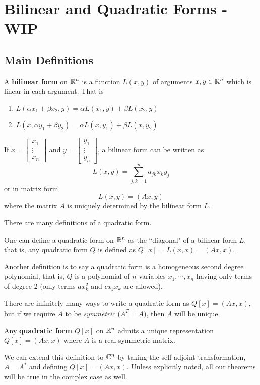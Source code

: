 \chapter{Bilinear and Quadratic Forms - WIP}

\section{Main Definitions}

\begin{definition}
A \textbf{bilinear form} on $\mathbb{R}^{n}$ is a function $L(x, y)$ of arguments $x, y \in \mathbb{R}^{n}$ which is linear in each argument. That is 
\begin{enumerate}
	\item $L(\alpha x_{1} + \beta x_{2}, y) = \alpha L(x_{1}, y) + \beta L(x_{2}, y)$
	\item $L(x, \alpha y_{1} + \beta y_{2}) = \alpha L(x, y_{1}) + \beta L(x, y_{2})$
\end{enumerate}

If $x = \begin{bmatrix}
x_{1} \\
\vdots \\
x_{n}
\end{bmatrix}$ and $y = \begin{bmatrix}
y_{1} \\
\vdots \\
y_{n}
\end{bmatrix}$, a bilinear form can be written as 
$$L(x, y) = \sum_{j, k = 1}^{n} a_{jk} x_{k} y_{j}$$
or in matrix form 
$$L(x, y) = (Ax, y)$$
where the matrix $A$ is uniquely determined by the bilinear form $L$.
\end{definition}

\begin{definition}
There are many definitions of a quadratic form. 

One can define a quadratic form on $\mathbb{R}^{n}$ as the ``diagonal" of a bilinear form $L$, that is, any quadratic form $Q$ is defined as $Q[x] = L(x, x) = (Ax, x)$. 

Another definition is to say a quadratic form is a homogeneous second degree polynomial, that is, $Q$ is a polynomial of $n$ variables $x_{1}, \cdots, x_{n}$ having only terms of degree 2 (only terms $ax_{k}^{2}$ and $cx_{j} x_{k}$ are allowed).

There are infinitely many ways to write a quadratic form as $Q[x] = (Ax, x)$, but if we require $A$ to be \textit{symmetric} ($A^{T} = A$), then $A$ will be unique. 

Any \textbf{quadratic form $Q[x]$} on $\mathbb{R}^{n}$ admits a unique representation $Q[x] = (Ax, x)$ where $A$ is a real symmetric matrix. 

We can extend this definition to $\mathbb{C}^{n}$ by taking the self-adjoint transformation, $A = A^{*}$ and defining $Q[x] = (Ax, x)$. Unless explicitly noted, all our theorems will be true in the complex case as well. 

\end{definition}

